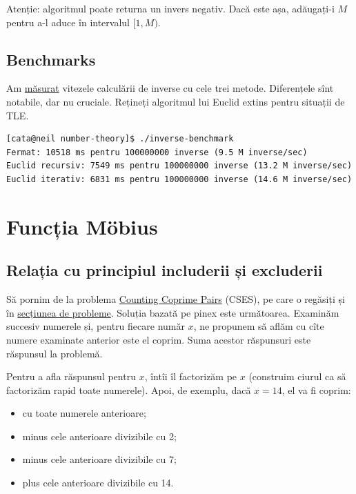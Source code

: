 \documentclass[../main.tex]{subfiles}
\begin{document}
Atenție: algoritmul poate returna un invers negativ. Dacă este așa, adăugați-i $M$ pentru a-l aduce în intervalul $[1, M)$.

\subsection{Benchmarks}

Am \href{https://github.com/CatalinFrancu/nerdvana/blob/main/number-theory/inverse-benchmark.cpp}{măsurat} vitezele calculării de inverse cu cele trei metode. Diferențele sînt notabile, dar nu cruciale. Rețineți algoritmul lui Euclid extins pentru situații de TLE.

\begin{verbatim}
[cata@neil number-theory]$ ./inverse-benchmark
Fermat: 10518 ms pentru 100000000 inverse (9.5 M inverse/sec)
Euclid recursiv: 7549 ms pentru 100000000 inverse (13.2 M inverse/sec)
Euclid iterativ: 6831 ms pentru 100000000 inverse (14.6 M inverse/sec)
\end{verbatim}


\section{Funcția Möbius}

\subsection{Relația cu principiul includerii și excluderii}

Să pornim de la problema \href{https://cses.fi/problemset/task/2417/}{Counting Coprime Pairs} (CSES), pe care o regăsiți și în \hyperref[problem:counting-coprime-pairs]{secțiunea de probleme}. Soluția bazată pe pinex este următoarea. Examinăm succesiv numerele și, pentru fiecare număr $x$, ne propunem să aflăm cu cîte numere examinate anterior este el coprim. Suma acestor răspunsuri este răspunsul la problemă.

Pentru a afla răspunsul pentru $x$, întîi îl factorizăm pe $x$ (construim ciurul ca să factorizăm rapid toate numerele). Apoi, de exemplu, dacă $x=14$, el va fi coprim:

\begin{itemize}
  \item cu toate numerele anterioare;
  \item minus cele anterioare divizibile cu 2;
  \item minus cele anterioare divizibile cu 7;
  \item plus cele anterioare divizibile cu 14.
\end{itemize}
\end{document}

